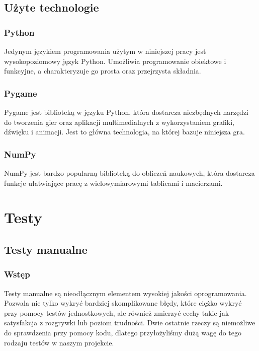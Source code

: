 \documentclass{article}
\begin{document}
\subsection{Użyte technologie}
\subsubsection{Python \cite{tech:Python}}
Jedynym językiem programowania użytym w niniejszej pracy jest wysokopoziomowy język Python. Umożliwia programowanie obiektowe i funkcyjne, a charakteryzuje go prosta oraz przejrzysta składnia.
\subsubsection{Pygame \cite{tech:Pygame}}
Pygame jest biblioteką w języku Python, która dostarcza niezbędnych narzędzi do tworzenia gier oraz aplikacji multimedialnych z wykorzystaniem grafiki, dźwięku i animacji. Jest to główna technologia, na której bazuje niniejsza gra.
\subsubsection{NumPy \cite{tech:NumPy}}
NumPy jest bardzo popularną biblioteką do obliczeń naukowych, która dostarcza funkcje ułatwiające pracę z wielowymiarowymi tablicami i macierzami.
\section{Testy}
\subsection{Testy manualne}
\subsubsection{Wstęp}
Testy manualne są nieodłącznym elementem wysokiej jakości oprogramowania. Pozwala nie tylko wykryć bardziej skomplikowane błędy, które ciężko wykryć przy pomocy testów jednostkowych, ale również zmierzyć cechy takie jak satysfakcja z rozgrywki lub poziom trudności. Dwie ostatnie rzeczy są niemożliwe do sprawdzenia przy pomocy kodu, dlatego przyłożyliśmy dużą wagę do tego rodzaju testów w naszym projekcie.
\end{document}
